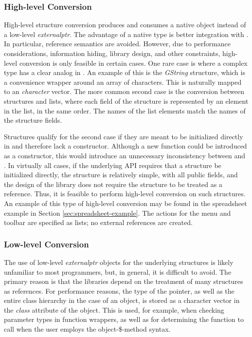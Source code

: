 \documentclass[article]{jss}
\begin{document}
\subsubsection[High-level Conversion]{High-level Conversion}\label{sec:high-level-conversion}

High-level structure conversion produces and consumes a native  object 
instead of a low-level \emph{externalptr}. The advantage of a native type is better
integration with . In particular, reference semantics are avoided.
However, due to performance considerations, information hiding, library design, 
and other constraints, high-level conversion is only feasible in certain cases.
One rare case is where a complex  type has a clear analog in .
An example of this is the \emph{GString} structure, which is a convenience
wrapper around an array of characters. This is naturally mapped to an 
\emph{character} vector. The more common second case is the conversion between
 structures and  lists, where each field of the structure
is represented by an element in the list, in the same order. The names of the 
list elements match the names of the structure fields.

Structures qualify for the second case if they are meant
to be initialized directly in  and therefore lack a constructor.
Although a new function could be introduced as a constructor, this would
introduce an unnecessary inconsistency between  and 
. In virtually all cases, if the underlying API requires that a structure
be initialized directly, the structure is relatively simple, with all public 
fields, and the design of the library does not require the structure to be 
treated as a reference. Thus, it is feasible to perform high-level conversion
on such structures. An example of this type of high-level conversion may be 
found in the spreadsheet example in Section \ref{sec:spreadsheet-example}. The 
actions for the menu and toolbar are specified as lists; no external 
references are created. 

\subsubsection[Low-level Conversion]{Low-level Conversion}

The use of low-level \emph{externalptr} objects for the underlying 
structures is likely unfamiliar to most  programmers, but, in general,
it is difficult to avoid. The primary reason is that the  libraries
depend on the treatment of many structures as references. For performance 
reasons, the type of the pointer, as well as the entire
class hierarchy in the case of an object, is stored as a character vector in the 
\emph{class} attribute of the  object. This is used, for example,
when checking parameter types in function wrappers, as well as for determining
the function to call when the user employs the object-\$-method syntax.
\end{document}
